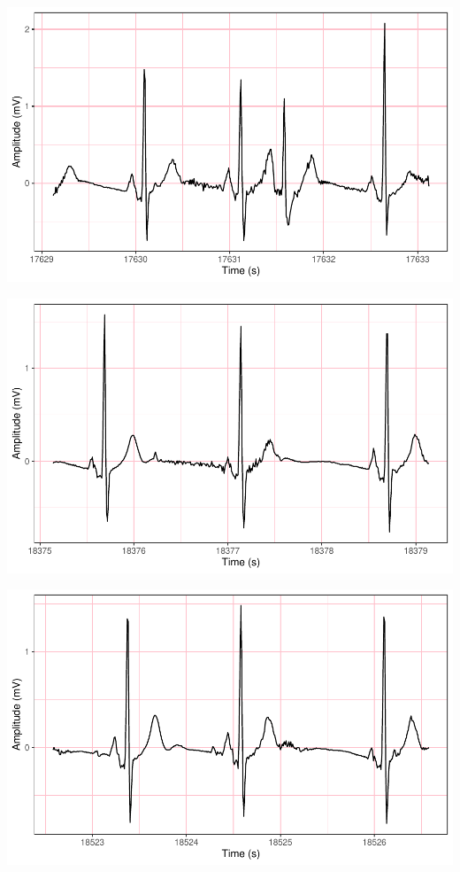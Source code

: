 \documentclass[
]{article}
\begin{document}
\begin{center}\includegraphics{report_files/figure-latex/abnormal-interval-30} \end{center}

\begin{center}\includegraphics{report_files/figure-latex/abnormal-interval-31} \end{center}

\begin{center}\includegraphics{report_files/figure-latex/abnormal-interval-32} \end{center}
\end{document}
